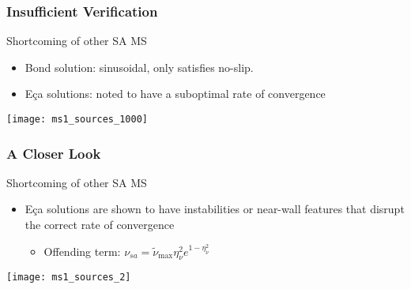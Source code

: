 \documentclass[mathserif]{beamer}
\begin{document}
\begin{frame}
 \frametitle{Insufficient Verification}

  \begin{block}{Shortcoming of other SA MS}
   \begin{itemize}
    \item Bond solution: sinusoidal, only satisfies no-slip.
    \item E\c{c}a solutions: noted to have a suboptimal rate of convergence
   \end{itemize}
  \end{block}	  

  \begin{center}
    \texttt{[image: ms1\_sources\_1000]} \\
  \end{center}

\end{frame}


\begin{frame}
\frametitle{A Closer Look}

 \begin{block}{Shortcoming of other SA MS}
  \begin{itemize}
    \item E\c{c}a solutions are shown to have instabilities or near-wall
	  features that disrupt the correct rate of convergence 
   \begin{itemize}
    \item Offending term: $\nu_{sa} = \tilde
	  \nu_{\text{max}}\eta_{\nu}^2e^{1-\eta^2_{\nu}}$
   \end{itemize}
  \end{itemize}
 \end{block}

 \begin{center}
  \texttt{[image: ms1\_sources\_2]} \\
 \end{center}

\end{frame}
\end{document}
